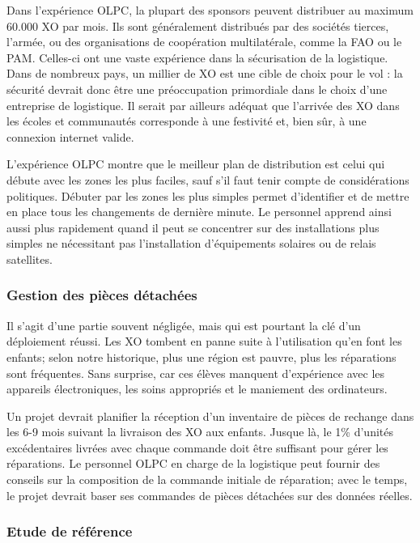 \documentclass[11pt]{article}
\begin{document}

Dans l'expérience OLPC, la plupart des sponsors peuvent distribuer au
maximum 60.000 XO par mois. Ils sont généralement distribués par des
sociétés tierces, l'armée, ou des organisations de coopération
multilatérale, comme la FAO ou le PAM. Celles-ci ont une vaste expérience
dans la sécurisation de la logistique. Dans de nombreux pays, un millier de
XO est une cible de choix pour le vol : la sécurité devrait donc être une
préoccupation primordiale dans le choix d'une entreprise de logistique. Il
serait par ailleurs adéquat que l'arrivée des XO dans les écoles et
communautés corresponde à une festivité et, bien sûr, à une connexion
internet valide.

L'expérience OLPC montre que le meilleur plan de distribution est celui qui
débute avec les zones les plus faciles, sauf s'il faut tenir compte de
considérations politiques. Débuter par les zones les plus simples permet
d’identifier et de mettre en place tous les changements de dernière
minute. Le personnel apprend ainsi aussi plus rapidement quand il peut se
concentrer sur des installations plus simples ne nécessitant pas
l'installation d'équipements solaires ou de relais satellites.
\subsubsection{Gestion des pièces détachées}
\label{sec-9-1-3}



Il s'agit d'une partie souvent négligée, mais qui est pourtant la clé d'un
déploiement réussi. Les XO tombent en panne suite à l'utilisation qu'en
font les enfants; selon notre historique, plus une région est pauvre, plus
les réparations sont fréquentes. Sans surprise, car ces élèves manquent
d'expérience avec les appareils électroniques, les soins appropriés et le
maniement des ordinateurs.

Un projet devrait planifier la réception d'un inventaire de pièces de
rechange dans les 6-9 mois suivant la livraison des XO aux enfants. Jusque
là, le 1\% d'unités excédentaires livrées avec chaque commande doit être
suffisant pour gérer les réparations. Le personnel OLPC en charge de la
logistique peut fournir des conseils sur la composition de la commande
initiale de réparation; avec le temps, le projet devrait baser ses
commandes de pièces détachées sur des données réelles.
\subsubsection{Etude de référence}
\label{sec-9-1-4}
\end{document}
